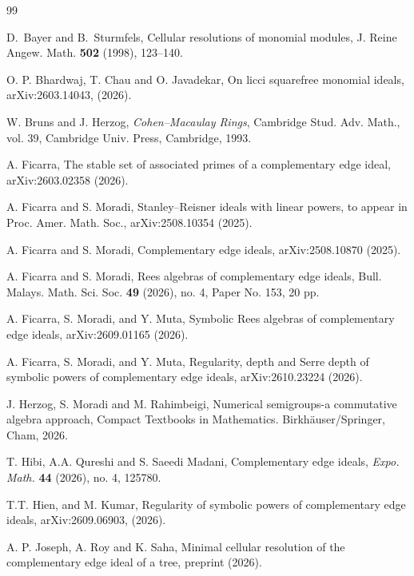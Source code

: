 \documentclass[12pt]{amsart}
\begin{document}
\begin{thebibliography}{99}
				
 D.~Bayer and B.~Sturmfels, Cellular resolutions of monomial modules, J. Reine Angew. Math. \textbf{502} (1998), 123--140.
            
 O. P. Bhardwaj, T. Chau and O. Javadekar,
On licci squarefree monomial ideals,
arXiv:2603.14043, (2026).

             W. Bruns and J. Herzog,
{\it Cohen--Macaulay Rings},
Cambridge Stud. Adv. Math., vol. 39, Cambridge Univ. Press, Cambridge, 1993.


				
			
 A. Ficarra,
The stable set of associated primes of a complementary edge ideal,
arXiv:2603.02358 (2026). 

 A. Ficarra and S. Moradi, 
Stanley--Reisner ideals with linear powers, to appear in Proc. Amer. Math. Soc.,
arXiv:2508.10354 (2025).

 A. Ficarra and S. Moradi, 
Complementary edge ideals, 
arXiv:2508.10870 (2025).


 A. Ficarra and S. Moradi, 
Rees algebras of complementary edge ideals, 
Bull. Malays. Math. Sci. Soc. {\bf 49} (2026), no. 4, Paper No. 153, 20 pp.

 A. Ficarra, S. Moradi, and Y. Muta, 
Symbolic Rees algebras of complementary edge ideals, 
arXiv:2609.01165 (2026).

 A. Ficarra, S. Moradi, and Y. Muta, 
Regularity, depth and Serre depth of symbolic powers of complementary edge ideals, arXiv:2610.23224 (2026). 
				


               J. Herzog, S. Moradi and M. Rahimbeigi,   Numerical semigroups-a commutative algebra approach, Compact Textbooks in Mathematics. Birkhäuser/Springer, Cham, 2026.
				
				
				 T. Hibi, A.A. Qureshi and S. Saeedi Madani, 
Complementary edge ideals, 
{\it Expo. Math.} {\bf 44} (2026), no. 4, 125780. 

 T.T. Hien, and M. Kumar, Regularity of symbolic powers of complementary edge ideals,
arXiv:2609.06903, (2026).

 A. P. Joseph, A. Roy and K. Saha, Minimal cellular resolution of the complementary edge ideal of a tree, preprint (2026).


\end{thebibliography}
\end{document}
